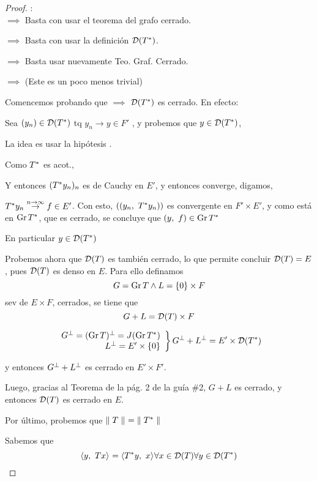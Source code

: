 \begin{proof}:\\

\iitem[i] $\implies$ \iitem[ii] Basta con usar el teorema del grafo cerrado.

\iitem[ii] $\implies$ \iitem[iii] Basta con usar la definición $\cd(T\adj)$.

\iitem[iii] $\implies$ \iitem[iv] Basta usar nuevamente Teo. Graf. Cerrado.

\iitem[iv] $\implies$ \iitem[i] (Este es un poco menos trivial) 

Comencemos probando que \iitem[iv] $\implies$ $\cd(T\adj)$ es cerrado. 
En efecto:

Sea $(y_n) \in \cd(T\adj)$ tq $y_n \to y \in F'$ , y probemos que $y \in \cd(T\adj)$,

La idea es usar la hipótesis \iitem[iv].

Como $T\adj$ es acot.,


Y entonces $(T\adj y_n)_n$ es de Cauchy en $E'$, y entonces converge, digamos,

$T\adj y_n \overset{n \to \infty}{\to} f \in E'$. Con esto, $((y_n,\ T\adj y_n))$ es convergente en $F' \times E'$, y como está en $\gr T\adj$, que es cerrado, se concluye que $(y,\ f) \in \gr T\adj$

En particular $y \in \cd(T\adj)$

Probemos ahora que $\cd(T)$ es también cerrado, lo que permite concluir $\cd(T) = E$ , pues $\cd(T)$ es denso en $E$. Para ello definamos $$
G = \gr T \wedge L = \{ 0 \} \times F
$$ sev de $E \times F$, cerrados, se tiene que $$
G + L = \cd(T) \times F
$$ 

$$
\left.
\begin{array}{r}
     G\ort = (\gr T)\ort = J(\gr T\adj )\\
     L\ort = E' \times \{ 0 \}
\end{array} \right \} G\ort + L\ort = E' \times \cd(T\adj)
$$

y entonces $G\ort + L\ort$ es cerrado en $E' \times F'$.

Luego, gracias al Teorema de la pág. 2 de la guía \#2, $G + L$ es cerrado, y entonces $\cd(T)$ es cerrado en $E$.

Por último, probemos que $\norm[]{T} = \norm[]{T\adj}$

Sabemos que $$
\prodint[]{y}{Tx} = \prodint[]{T\adj y}{x} \forall x \in \cd(T) \forall y \in \cd(T\adj)
$$


\end{proof}
